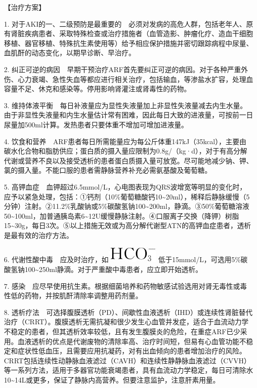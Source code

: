 【治疗方案】

1.
对于AKI的一、二级预防是最重要的　必须对发病的高危人群，包括老年人、原有肾脏疾病患者、采取特殊检查或治疗措施者（血管造影、肿瘤化疗、造血干细胞移植、器官移植、特殊抗生素使用等）给予相应保护措施并密切跟踪病程中尿量、血肌酐的动态变化，以期早诊断、早治疗。

2.
纠正可逆的病因　早期干预治疗ARF首先要纠正可逆的病因。对于各种严重外伤、心力衰竭、急性失血等都应进行相关治疗，包括输血，等渗盐水扩容，处理血容量不足、休克和感染等。停用影响肾灌注或肾毒性的药物。

3.
维持体液平衡　每日补液量应为显性失液量加上非显性失液量减去内生水量。由于非显性失液量和内生水量估计常有困难，因此每日大致的进液量，可按前一日尿量加500ml计算。发热患者只要体重不增加可增加进液量。

4.
饮食和营养　ARF患者每日所需能量应为每公斤体重147kJ（35kcal），主要由碳水化合物和脂肪供应；蛋白质的摄入量应限制为0.8g/（kg·d），对于有高分解代谢或营养不良以及接受透析的患者蛋白质摄入量可放宽。尽可能地减少钠、钾、氯的摄入量。不能口服的患者需静脉营养补充必需氨基酸及葡萄糖。

5.
高钾血症　血钾超过6.5mmol/L，心电图表现为QRS波增宽等明显的变化时，应予以紧急处理，包括：①钙剂（10\%葡萄糖酸钙10\textasciitilde{}20ml），稀释后静脉缓慢（5分钟）注射。②11.2\%乳酸钠或5\%碳酸氢钠100\textasciitilde{}200ml，静滴。③50\%葡萄糖溶液50\textasciitilde{}100ml，加普通胰岛素6\textasciitilde{}12U缓慢静脉注射。④口服离子交换（降钾）树脂15\textasciitilde{}30g，每日3次。⑤以上措施无效或为高分解代谢型ATN的高钾血症患者，透析是最有效的治疗方法。

6. 代谢性酸中毒　应及时治疗，如\includegraphics{./images/Image00128.jpg}
低于15mmol/L，可选用5\%碳酸氢钠100\textasciitilde{}250ml静滴。对于严重酸中毒患者，应立即开始透析。

7.
感染　应尽早使用抗生素。根据细菌培养和药物敏感试验选用对肾无毒性或毒性低的药物，并按肌酐清除率调整用药剂量。

8.
透析疗法　可选择腹膜透析（PD）、间歇性血液透析（IHD）或连续性肾脏替代治疗（CRRT）。腹膜透析无需抗凝和很少发生心血管并发症，适合于血流动力学不稳定的患者，但其透析效率较低，且有发生腹膜炎的危险，在重症ARF已少采用。血液透析的优点是代谢废物的清除率高、治疗时间短，但易有心血管功能不稳定和症状性低血压，且需要应用抗凝药，对有出血倾向的患者增加治疗的风险。CRRT包括连续性动静脉血液滤过（CAVH）和连续性静静脉血液滤过（CVVH）等一系列方法，适用于多器官功能衰竭患者，具有血流动力学稳定，每日可清除水10\textasciitilde{}14L或更多，保证了静脉内高营养。但要注意监护，注意肝素用量。

